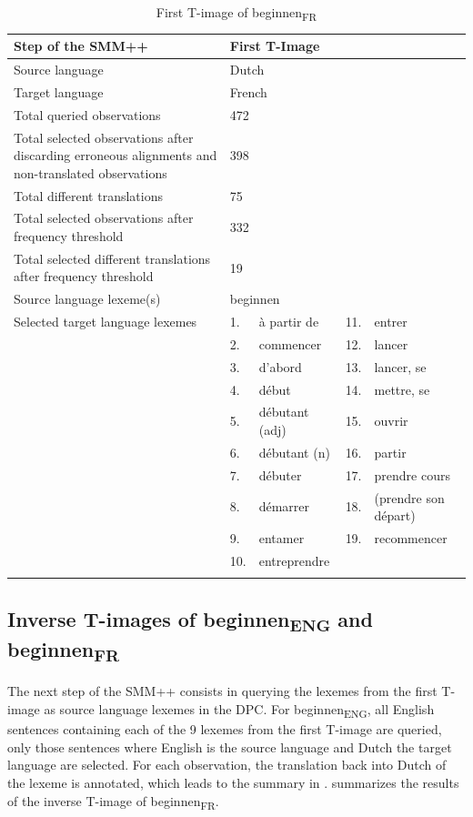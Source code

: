 \begin{table}
\caption{First T-image of beginnen\textsubscript{FR}\label{tab:3:7}}
\small
\begin{tabularx}{\textwidth}{p{}lXlX}
\lsptoprule
Step of the SMM++ & \multicolumn{4}{l}{First T-Image}\\ \midrule
\rowcolor{lsLightGray}Source language & \multicolumn{4}{l}{Dutch}\\
Target language & \multicolumn{4}{l}{French}\\
\rowcolor{lsLightGray}Total queried observations & \multicolumn{4}{l}{472}\\
Total selected observations after discarding erroneous alignments and non-translated observations & \multicolumn{4}{l}{398}\\
\rowcolor{lsLightGray}Total different translations & \multicolumn{4}{l}{75}\\
Total selected observations after frequency threshold & \multicolumn{4}{l}{332}\\
\rowcolor{lsLightGray}Total selected different translations after frequency threshold & \multicolumn{4}{l}{19}\\
Source language lexeme(s) & \multicolumn{4}{l}{beginnen}\\
\rowcolor{lsLightGray}Selected target language lexemes &  1.& à partir de & 11.& entrer \\ 
\rowcolor{lsLightGray}& 2. & commencer & 12.& lancer \\ 
\rowcolor{lsLightGray}& 3. & d'abord & 13.& lancer, se \\
\rowcolor{lsLightGray}& 4. & début & 14.& mettre, se \\  
\rowcolor{lsLightGray}& 5. & débutant (adj) & 15.& ouvrir \\
\rowcolor{lsLightGray}& 6. & débutant (n) & 16.& partir \\ 
\rowcolor{lsLightGray}& 7. & débuter & 17.& prendre cours \\  
\rowcolor{lsLightGray}& 8. & démarrer & 18.& (prendre son départ) \\  
\rowcolor{lsLightGray}& 9. &entamer & 19.& recommencer \\
\rowcolor{lsLightGray}& 10.& entreprendre &&  \\
\lspbottomrule
\end{tabularx}
\end{table}

\subsection{Inverse T-images of beginnen\textsubscript{ENG} and beginnen\textsubscript{FR}}
\label{sec:3.6.2}
The next step of the SMM++ consists in querying the lexemes from the first T-image as source language lexemes in the DPC. For beginnen\textsubscript{ENG}, all English sentences containing each of the 9 lexemes from the first T-image are queried, only those sentences where English is the source language and Dutch the target language are selected. For each observation, the translation back into Dutch of the lexeme is annotated, which leads to the summary in .  summarizes the results of the inverse T-image of beginnen\textsubscript{FR}.

